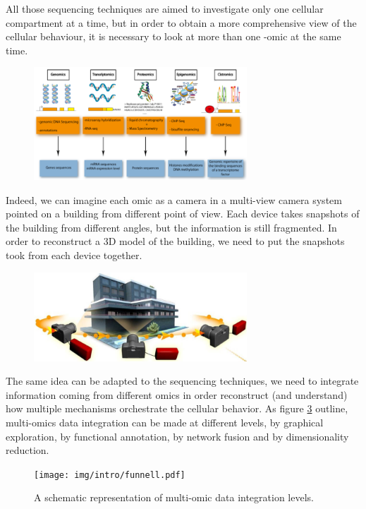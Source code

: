 All those sequencing techniques are aimed to investigate only one cellular compartment at a time, but in order to obtain a more comprehensive view of the cellular behaviour, it is necessary to look at more than one -omic at the same time.

\begin{figure}[h]
\centering
\includegraphics[width=8cm, keepaspectratio]{img/intro/omics.png}
\caption[Omics Representation]{}
\label{fig:omics}
\end{figure}

Indeed, we can imagine each omic as a camera in a multi-view camera system pointed on a building from different point of view.
Each device takes snapshots of the building from different angles, but the information is still fragmented.
In order to reconstruct a 3D model of the building, we need to put the snapshots took from each device together.

\begin{figure}[h]
\centering
\includegraphics[width=8cm, keepaspectratio]{img/intro/cameras.png}
\caption[Integration cameras]{}
\label{fig:cameras}
\end{figure}

The same idea can be adapted to the sequencing techniques, we need to integrate information coming from different omics in order reconstruct (and understand) how multiple mechanisms orchestrate the cellular behavior.
As figure \ref{fig:funnell} outline, multi-omics data integration can be made at different levels, by graphical exploration, by functional annotation, by network fusion and by dimensionality reduction.

\begin{figure}[h]
\centering
\texttt{[image: img/intro/funnell.pdf]}
\caption[Integration Funnell]{A schematic representation of multi-omic data integration levels.}
\label{fig:funnell}
\end{figure}

